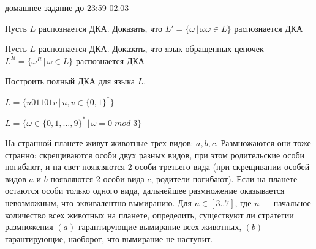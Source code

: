 \documentclass[12pt]{article}
\begin{document}

{\Large домашнее задание до 23:59 02.03}
\bigskip

\enumerate
{
  \item Пусть $L$ распознается ДКА. Доказать, что $L' = \{ \omega \, | \, \omega \omega \in L\}$ распознается ДКА
  \item Пусть $L$ распознается ДКА. Доказать, что язык обращенных цепочек $L^R = \{ \omega^R \, | \, \omega \in L\}$ распознается ДКА
  
  \item
  { Построить полный ДКА для языка $L$.
    \enumerate 
    {
      \item $L = \{u 01101 v \, | \, u, v \in \{0,1\}^*\} $
      \item $L = \{ \omega \in \{0, 1, \dots, 9\}^* \, | \, \omega = 0 \; mod \; 3 \}$ 
   
    }
  }
  \item На странной планете живут животные трех видов: $a, b, c$. Размножаются они тоже странно: скрещиваются особи двух разных видов, при этом родительские особи погибают, и на свет появляются 2 особи третьего вида (при скрещивании особей видов $a$ и $b$ появляются 2 особи вида $c$, родители погибают). Если на планете остаются особи только одного вида, дальнейшее размножение оказывается невозможным, что эквивалентно вымиранию. Для $n \in [3..7]$, где $n$ --- начальное количество всех животных на планете, определить, существуют ли стратегии размножения $(a)$ гарантирующие вымирание всех животных, $(b)$ гарантирующие, наоборот, что вымирание не наступит. 
}
\end{document}
